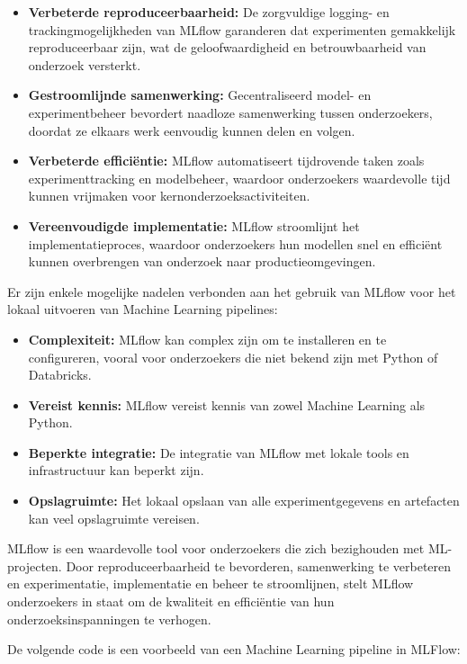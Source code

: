\begin{itemize}
    \item \textbf{Verbeterde reproduceerbaarheid:} De zorgvuldige logging- en trackingmogelijkheden van MLflow garanderen dat experimenten gemakkelijk reproduceerbaar zijn, wat de geloofwaardigheid en betrouwbaarheid van onderzoek versterkt.
    \item \textbf{Gestroomlijnde samenwerking:} Gecentraliseerd model- en experimentbeheer bevordert naadloze samenwerking tussen onderzoekers, doordat ze elkaars werk eenvoudig kunnen delen en volgen.
    \item \textbf{Verbeterde efficiëntie:} MLflow automatiseert tijdrovende taken zoals experimenttracking en modelbeheer, waardoor onderzoekers waardevolle tijd kunnen vrijmaken voor kernonderzoeksactiviteiten.
    \item \textbf{Vereenvoudigde implementatie:} MLflow stroomlijnt het implementatieproces, waardoor onderzoekers hun modellen snel en efficiënt kunnen overbrengen van onderzoek naar productieomgevingen.
\end{itemize}

Er zijn enkele mogelijke nadelen verbonden aan het gebruik van MLflow voor het lokaal uitvoeren van Machine Learning pipelines:

\begin{itemize}
    \item \textbf{Complexiteit:} MLflow kan complex zijn om te installeren en te configureren, vooral voor onderzoekers die niet bekend zijn met Python of Databricks.
    \item \textbf{Vereist kennis:} MLflow vereist kennis van zowel Machine Learning als Python.
    \item \textbf{Beperkte integratie:} De integratie van MLflow met lokale tools en infrastructuur kan beperkt zijn.
    \item \textbf{Opslagruimte:} Het lokaal opslaan van alle experimentgegevens en artefacten kan veel opslagruimte vereisen.
\end{itemize}
MLflow is een waardevolle tool voor onderzoekers die zich bezighouden met ML-projecten. Door reproduceerbaarheid te bevorderen, samenwerking te verbeteren en experimentatie, implementatie en beheer te stroomlijnen, stelt MLflow onderzoekers in staat om de kwaliteit en efficiëntie van hun onderzoeksinspanningen te verhogen.

De volgende code is een voorbeeld van een Machine Learning pipeline in MLFlow:

